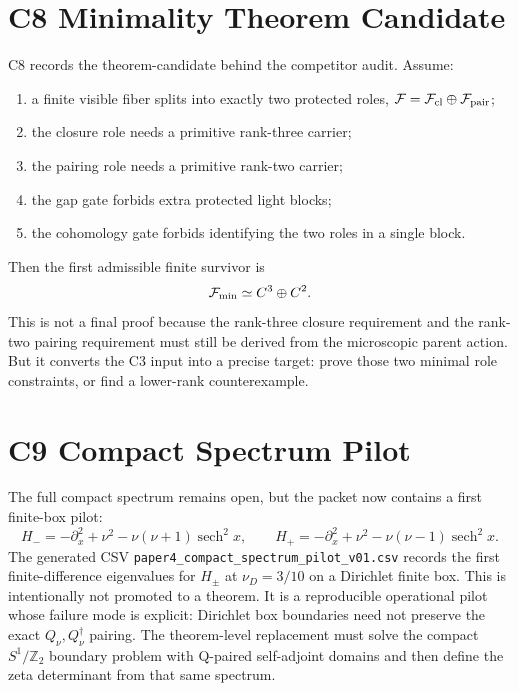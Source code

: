 \documentclass[11pt]{article}
\begin{document}
\section{C8 Minimality Theorem Candidate}
C8 records the theorem-candidate behind the competitor audit.  Assume:
\begin{enumerate}
\item a finite visible fiber splits into exactly two protected roles,
${\cal F}={\cal F}_{\rm cl}\oplus{\cal F}_{\rm pair}$;
\item the closure role needs a primitive rank-three carrier;
\item the pairing role needs a primitive rank-two carrier;
\item the gap gate forbids extra protected light blocks;
\item the cohomology gate forbids identifying the two roles in a single block.
\end{enumerate}
Then the first admissible finite survivor is
\begin{equation}
{\cal F}_{\min}\simeq C^3\oplus C^2.
\end{equation}
This is not a final proof because the rank-three closure requirement and the
rank-two pairing requirement must still be derived from the microscopic parent
action.  But it converts the C3 input into a precise target: prove those two
minimal role constraints, or find a lower-rank counterexample.

\section{C9 Compact Spectrum Pilot}
The full compact spectrum remains open, but the packet now contains a first
finite-box pilot:
\begin{equation}
H_-=-\partial_x^2+\nu^2-\nu(\nu+1)\operatorname{sech}^2x,\qquad
H_+=-\partial_x^2+\nu^2-\nu(\nu-1)\operatorname{sech}^2x .
\end{equation}
The generated CSV \texttt{paper4\_compact\_spectrum\_pilot\_v01.csv} records
the first finite-difference eigenvalues for $H_\pm$ at $\nu_D=3/10$ on a
Dirichlet finite box.  This is intentionally not promoted to a theorem.  It is
a reproducible operational pilot whose failure mode is explicit: Dirichlet
box boundaries need not preserve the exact $Q_\nu,Q_\nu^\dagger$ pairing.  The
theorem-level replacement must solve the compact $S^1/\mathbb Z_2$ boundary
problem with Q-paired self-adjoint domains and then define the zeta determinant
from that same spectrum.
\end{document}
